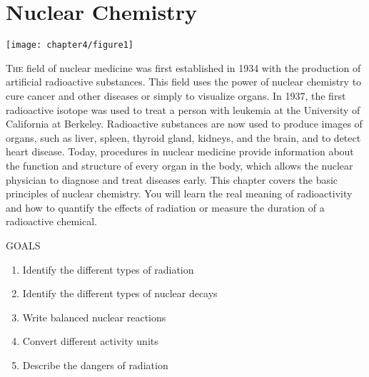 \documentclass[main.tex]{subfiles}
\begin{document}
\chapter[Nuclear Chemistry]{Nuclear Chemistry}

\begin{marginfigure}
      \texttt{[image: chapter4/figure1]}
   \end{marginfigure}
\lettrine[lines=4]{\color{black!45}T}{he} field of nuclear medicine was first established in 1934 with the production of artificial radioactive substances. This field uses the power of nuclear chemistry to cure cancer and other diseases or simply to visualize organs. In 1937, the first radioactive isotope was used to treat a person with leukemia at the University of California at Berkeley. Radioactive substances are now used to produce images of organs, such as liver, spleen, thyroid gland, kidneys, and the brain, and to detect heart disease. Today, procedures in nuclear medicine provide information about the function and structure of every organ in the body, which allows the nuclear physician to diagnose and treat diseases early. This chapter covers the basic principles of nuclear chemistry. You will learn the real meaning of radioactivity and how to quantify the effects of radiation or measure the duration of a radioactive chemical.
\begin{marginfigure}%
\begin{mytcbox}{GOALS}
\begin{enumerate}[label=\protect\circled{\color{white}\arabic*}]
\item Identify the different types of radiation
\item Identify the different types of nuclear decays
\item Write balanced nuclear reactions
\item Convert different activity units
\item Describe the dangers of radiation

\end{enumerate}
\end{mytcbox}
\end{marginfigure}%
\end{document}
